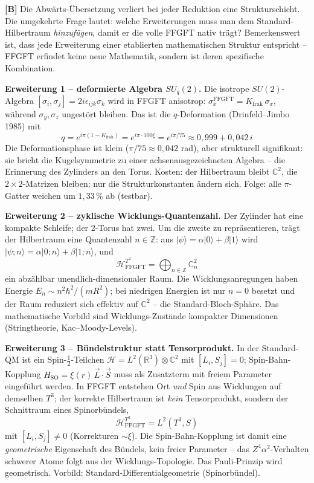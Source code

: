 \textbf{[B]} Die Abwärts-Übersetzung verliert bei jeder Reduktion eine
Strukturschicht. Die umgekehrte Frage lautet: welche Erweiterungen muss man dem
Standard-Hilbertraum \emph{hinzufügen}, damit er die volle FFGFT nativ trägt?
Bemerkenswert ist, dass jede Erweiterung einer etablierten mathematischen
Struktur entspricht -- FFGFT erfindet keine neue Mathematik, sondern ist deren
spezifische Kombination.

\textbf{Erweiterung 1 -- deformierte Algebra $SU_q(2)$.} Die isotrope
$SU(2)$-Algebra $[\sigma_i,\sigma_j]=2i\epsilon_{ijk}\sigma_k$ wird in FFGFT
anisotrop: $\sigma_x^{\text{FFGFT}} = K_{\text{frak}}\,\sigma_x$, während
$\sigma_y,\sigma_z$ ungestört bleiben. Das ist die $q$-Deformation
(Drinfeld--Jimbo 1985) mit
\[
  \boxed{\;q = e^{i\pi(1-K_{\text{frak}})} = e^{i\pi\cdot100\xi} = e^{i\pi/75}
        \approx 0{,}999 + 0{,}042\,i\;}
\]
Die Deformationsphase ist klein ($\pi/75\approx0{,}042$ rad), aber strukturell
signifikant: sie bricht die Kugelsymmetrie zu einer achsenausgezeichneten
Algebra -- die Erinnerung des Zylinders an den Torus. Kosten: der Hilbertraum
bleibt $\mathbb{C}^2$, die $2\times2$-Matrizen bleiben; nur die Strukturkonstanten
ändern sich. Folge: alle $\pi$-Gatter weichen um $1{,}33\,\%$ ab (testbar).

\textbf{Erweiterung 2 -- zyklische Wicklungs-Quantenzahl.} Der Zylinder hat eine
kompakte Schleife; der 2-Torus hat zwei. Um die zweite zu repräsentieren, trägt
der Hilbertraum eine Quantenzahl $n\in\mathbb{Z}$: aus
$|\psi\rangle = \alpha|0\rangle+\beta|1\rangle$ wird
$|\psi;n\rangle = \alpha|0;n\rangle+\beta|1;n\rangle$, und
\[
  \boxed{\;\mathcal{H}^{T^2}_{\text{FFGFT}} = \bigoplus_{n\in\mathbb{Z}}\mathbb{C}^2_n\;}
\]
ein abzählbar unendlich-dimensionaler Raum. Die Wicklungsanregungen haben Energie
$E_n\sim n^2\hbar^2/(mR^2)$; bei niedrigen Energien ist nur $n=0$ besetzt und der
Raum reduziert sich effektiv auf $\mathbb{C}^2$ -- die Standard-Bloch-Sphäre. Das
mathematische Vorbild sind Wicklungs-Zustände kompakter Dimensionen
(Stringtheorie, Kac--Moody-Levels).

\textbf{Erweiterung 3 -- Bündelstruktur statt Tensorprodukt.} In der Standard-QM
ist ein Spin-$\tfrac12$-Teilchen $\mathcal{H} = L^2(\mathbb{R}^3)\otimes\mathbb{C}^2$
mit $[L_i,S_j]=0$; Spin-Bahn-Kopplung $H_{\text{SO}}=\xi(r)\,\vec L\cdot\vec S$
muss als Zusatzterm mit freiem Parameter eingeführt werden. In FFGFT entstehen
Ort \emph{und} Spin aus Wicklungen auf demselben $T^3$; der korrekte Hilbertraum
ist \emph{kein} Tensorprodukt, sondern der Schnittraum eines Spinorbündels,
\[
  \boxed{\;\mathcal{H}^{T^3}_{\text{FFGFT}} = L^2(T^3, S)\;}
\]
mit $[L_i,S_j]\neq0$ (Korrekturen $\sim\xi$). Die Spin-Bahn-Kopplung ist damit
eine \emph{geometrische} Eigenschaft des Bündels, kein freier Parameter -- das
$Z^4\alpha^2$-Verhalten schwerer Atome folgt aus der Wicklungs-Topologie. Das
Pauli-Prinzip wird geometrisch. Vorbild: Standard-Differentialgeometrie
(Spinorbündel).

